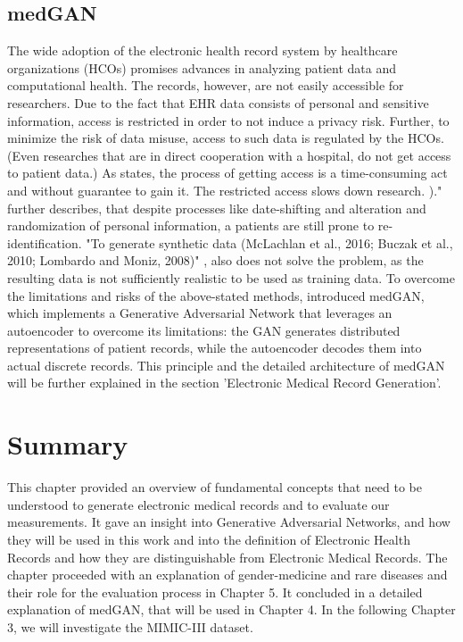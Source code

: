 \documentclass[11pt, a4paper]{book}
\begin{document}
\subsection{medGAN}
The wide adoption of the electronic health record system by healthcare organizations (HCOs) promises advances in analyzing patient data and computational health. The records, however, are not easily accessible for researchers. Due to the fact that EHR data consists of personal and sensitive information, access is restricted in order to not induce a privacy risk. Further, to minimize the risk of data misuse, access to such data is regulated by the HCOs. \cite{Choi2017}
(Even researches that are in direct cooperation with a hospital, do not get access to patient data.)
 As \cite{Choi2017} states, the process of getting access is a time-consuming act and without guarantee to gain it. The restricted access slows down research. )." \cite{Choi2017} further describes, that despite processes like date-shifting and alteration and randomization of personal  information, a patients are still prone to re-identification. "To generate synthetic data (McLachlan et al., 2016; Buczak et al., 2010; Lombardo and Moniz, 2008)" \citep{Choi2017}, also does not solve the problem, as the resulting data is not sufficiently realistic to be used as training data.
 To overcome the limitations and risks of the above-stated methods, \cite{Choi2017} introduced medGAN, which implements a Generative Adversarial Network that leverages an autoencoder to overcome its limitations: the GAN generates distributed representations of patient records, while the autoencoder decodes them into actual discrete records.
 This principle and the detailed architecture of medGAN will be further explained in the section 'Electronic Medical Record Generation'.

\section{Summary}
This chapter provided an overview of fundamental concepts that need to be understood to generate electronic medical records and to evaluate our measurements.
It gave an insight into Generative Adversarial Networks, and how they will be used in this work and into the definition of Electronic Health Records and how they are distinguishable from Electronic Medical Records.
The chapter proceeded with an explanation of gender-medicine and rare diseases and their role for the evaluation process in Chapter 5. It concluded in a detailed explanation of medGAN, that will be used in Chapter 4. In the following Chapter 3, we will investigate the MIMIC-III dataset.
\end{document}
